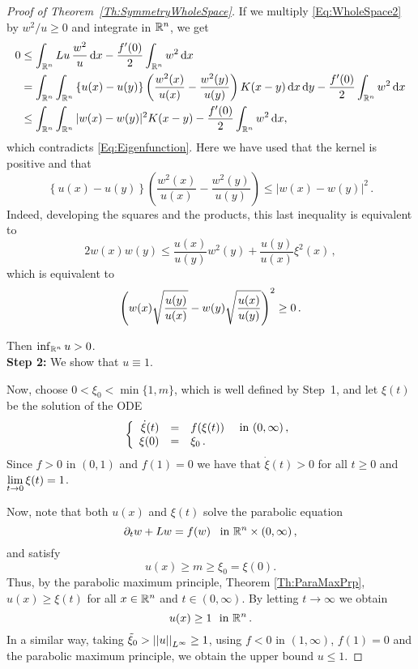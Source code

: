 \begin{proof}[Proof of Theorem~\ref{Th:SymmetryWholeSpace}]
If we multiply \eqref{Eq:WholeSpace2} by $w^2/u\geq 0$ and integrate in $\mathbb{R}^n$, we get
\begin{align*}
0 &\leq \int_{\mathbb{R}^n} Lu\,\frac{w^2}{u} \,\mathrm{d} x - \frac{f'(0)}{2}\int_{\mathbb{R}^n} w^2 \,\mathrm{d} x \\
&= \int_{\mathbb{R}^n}\int_{\mathbb{R}^n}\left\{ u(x)-u(y) \right\} \left( \frac{w^2(x)}{u(x)}-\frac{w^2(y)}{u(y)} \right) K(x-y) \,\mathrm{d} x \,\mathrm{d} y - \frac{f'(0)}{2}\int_{\mathbb{R}^n} w^2 \,\mathrm{d} x \\
&\leq \int_{\mathbb{R}^n}\int_{\mathbb{R}^n} |w(x)-w(y)|^2 K(x-y) - \frac{f'(0)}{2}\int_{\mathbb{R}^n} w^2 \,\mathrm{d} x ,
\end{align*}
which contradicts \eqref{Eq:Eigenfunction}. Here we have used that the kernel is positive and that
$$
\left\{ u(x)-u(y) \right\} \left( \frac{w^2(x)}{u(x)}-\frac{w^2(y)}{u(y)} \right)  \leq |w (x) - w(y)|^2\,.
$$
Indeed, developing the squares and the products, this last inequality is equivalent to
$$
2 w(x) w(y) \leq \dfrac{u(x)}{u(y)} w^2(y) +  \dfrac{u(y)}{u(x)} \xi^2 (x)\,,
$$
which is equivalent to
$$
\left ( {w (x)\sqrt{\dfrac{u(y)}{u(x)}} - w(y) \sqrt{\dfrac{u(x)}{u(y)} } }\right )^2 \geq 0\,.
$$


Then $\inf_{\mathbb{R}^n} u >0$.\\

\textbf{Step 2:} We show that $u\equiv 1$.

Now, choose $0<\xi_0<\min\{1,m\}$, which is well defined by Step~1, and let $\xi(t)$ be the solution of the ODE
$$
\left\{\begin{array}{rcll}
\dot{\xi}(t) &=& f(\xi(t)) & \textrm{ in }(0,\infty)\,,\\
\xi(0) &=& \xi_0\,.
\end{array} \right.
$$
Since $f>0$ in $(0,1)$ and $f(1) = 0$ we have that $\dot{\xi}(t)>0$ for all $t\geq 0$ and $\displaystyle \lim_{t\to 0} \xi(t) = 1$.

Now, note that both $u(x)$ and $\xi(t)$ solve the parabolic equation
$$ \partial_t w + Lw = f(w) \,\,\, \textrm{ in }\mathbb{R}^n\times (0,\infty)\,, $$
and satisfy
$$ u(x) \geq m \geq \xi_0 = \xi(0). $$
Thus, by the parabolic maximum principle, Theorem \ref{Th:ParaMaxPrp}, $u(x)\geq \xi(t)$ for all $x\in\mathbb{R}^n$ and $t\in(0,\infty)$. By letting $t \to \infty$ we obtain
$$ u(x) \geq 1 \,\, \textrm{ in }\mathbb{R}^n\,.  $$
In a similar way, taking $\tilde{\xi}_0>\left | \left |{u} \right | \right |_{L^\infty} \geq 1$, using $f<0$ in $(1,\infty)$, $f(1)=0$ and the parabolic maximum principle, we obtain the upper bound $u\leq 1$.

\end{proof}




